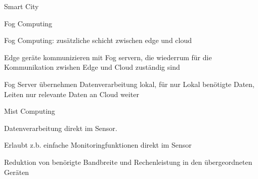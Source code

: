 \begin{notes}
\begin{notes}
\begin{notes}
\begin{notes}
                \item Smart City
            \end{notes}
        \end{notes}
        \item Fog Computing
        \begin{notes} 
            \item Fog Computing: zusätzliche schicht zwischen edge und cloud
            \item Edge geräte kommunizieren mit Fog servern, die wiederrum für die Kommunikation zwishen Edge und Cloud zuständig sind
            \item Fog Server übernehmen Datenverarbeitung lokal, für nur Lokal benötigte Daten, Leiten nur relevante Daten an Cloud weiter
        \end{notes}
        \item Mist Computing
        \begin{notes} 
            \item Datenverarbeitung direkt im Sensor.
            \item Erlaubt z.b. einfache Monitoringfunktionen direkt im Sensor
            \item Reduktion von benörigte Bandbreite und Rechenleistung in den übergeordneten Geräten
        \end{notes}
    \end{notes}
\end{notes}